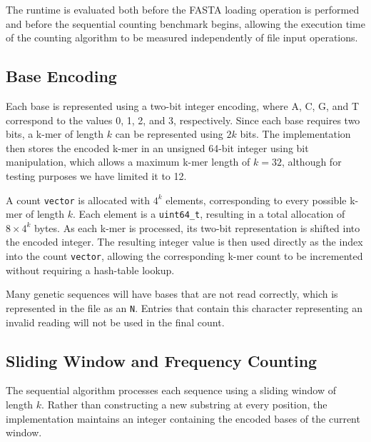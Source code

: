 \documentclass{article}
\begin{document}
The runtime is evaluated both before the FASTA loading operation is performed and before the sequential counting benchmark begins, allowing the
execution time of the counting algorithm to be measured independently of file input operations. 

\vspace{\baselineskip}

\subsection{Base Encoding}

\vspace{\baselineskip}

Each base is represented using a two-bit integer encoding, where A, C, G, and T correspond to the values
0, 1, 2, and 3, respectively. Since each base requires two bits, a k-mer of length $k$ can be represented
using $2k$ bits. The implementation then stores the encoded k-mer in an unsigned 64-bit integer using bit manipulation, 
which allows a maximum k-mer length of $k=32$, although for testing purposes we have limited it to 12.

\vspace{\baselineskip}

A count \texttt{vector} is allocated with $4^k$ elements, corresponding to every possible k-mer of length $k$.
Each element is a \texttt{uint64\_t}, resulting in a total allocation of $8 \times 4^k$ bytes. As each
k-mer is processed, its two-bit representation is shifted into the encoded integer. The resulting integer
value is then used directly as the index into the count \texttt{vector}, allowing the corresponding k-mer count
to be incremented without requiring a hash-table lookup.

\vspace{\baselineskip}

Many genetic sequences will have bases that are not read correctly, which is represented in the file as an \texttt{N}. 
Entries that contain this character representing an invalid reading will not be used in the final count.

\subsection{Sliding Window and Frequency Counting}

The sequential algorithm processes each sequence using a sliding window of length $k$. Rather than
constructing a new substring at every position, the implementation maintains an integer containing the
encoded bases of the current window.
\end{document}
